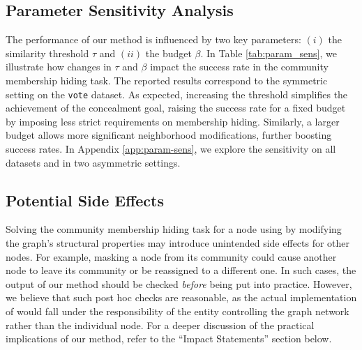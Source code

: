 \subsection{Parameter Sensitivity Analysis}
\label{subsec:param-sens}
The performance of our method is influenced by two key parameters: $(i)$ the similarity threshold $\tau$ and $(ii)$ the budget $\beta$. In Table \ref{tab:param_sens}, we illustrate how changes in $\tau$ and $\beta$ impact the success rate in the community membership hiding task.
The reported results correspond to the symmetric setting on the \texttt{vote} dataset. As expected, increasing the threshold simplifies the achievement of the concealment goal, raising the success rate for a fixed budget by imposing less strict requirements on membership hiding. Similarly, a larger budget allows more significant neighborhood modifications, further boosting success rates. In Appendix \ref{app:param-sens}, we explore the sensitivity on all datasets and in two asymmetric settings.


\subsection{Potential Side Effects}
Solving the community membership hiding task for a node using {\method} by modifying the graph's structural properties may introduce unintended side effects for other nodes. For example, masking a node from its community could cause another node to leave its community or be reassigned to a different one. 
In such cases, the output of our method should be checked \textit{before} being put into practice. However, we believe that such post hoc checks are reasonable, as the actual implementation of {\method} would fall under the responsibility of the entity controlling the graph network rather than the individual node. For a deeper discussion of the practical implications of our method, refer to the ``Impact Statements'' section below.